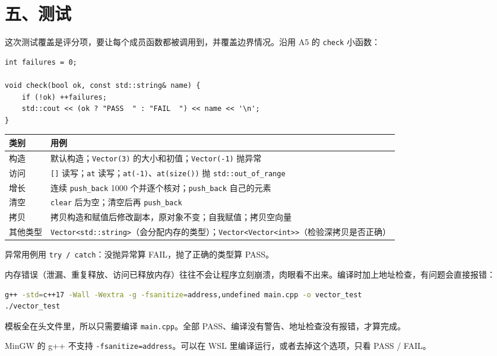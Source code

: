 \documentclass[11pt,a4paper]{article}
\newcommand{\code}[1]{\texttt{#1}}
\begin{document}
\section{五、测试}

这次测试覆盖是评分项，要让每个成员函数都被调用到，并覆盖边界情况。沿用 A5 的 \code{check} 小函数：

\begin{lstlisting}
int failures = 0;

void check(bool ok, const std::string& name) {
    if (!ok) ++failures;
    std::cout << (ok ? "PASS  " : "FAIL  ") << name << '\n';
}
\end{lstlisting}

\begin{center}
\small
\begin{tabularx}{\linewidth}{@{}lX@{}}
\toprule
类别 & 用例 \\
\midrule
构造 & 默认构造；\code{Vector(3)} 的大小和初值；\code{Vector(-1)} 抛异常 \\
访问 & \code{[]} 读写；\code{at} 读写；\code{at(-1)}、\code{at(size())} 抛 \code{std::out\_of\_range} \\
增长 & 连续 \code{push\_back} 1000 个并逐个核对；\code{push\_back} 自己的元素 \\
清空 & \code{clear} 后为空；清空后再 \code{push\_back} \\
拷贝 & 拷贝构造和赋值后修改副本，原对象不变；自我赋值；拷贝空向量 \\
其他类型 & \code{Vector<std::string>}（会分配内存的类型）；\code{Vector<Vector<int>>}（检验深拷贝是否正确） \\
\bottomrule
\end{tabularx}
\end{center}

异常用例用 \code{try / catch}：没抛异常算 FAIL，抛了正确的类型算 PASS。

内存错误（泄漏、重复释放、访问已释放内存）往往不会让程序立刻崩溃，肉眼看不出来。编译时加上地址检查，有问题会直接报错：

\begin{lstlisting}[language=bash]
g++ -std=c++17 -Wall -Wextra -g -fsanitize=address,undefined main.cpp -o vector_test
./vector_test
\end{lstlisting}

模板全在头文件里，所以只需要编译 \code{main.cpp}。全部 PASS、编译没有警告、地址检查没有报错，才算完成。

\begin{tip}[Windows 用户]
MinGW 的 g++ 不支持 \code{-fsanitize=address}。可以在 WSL 里编译运行，或者去掉这个选项，只看 PASS / FAIL。
\end{tip}
\end{document}
